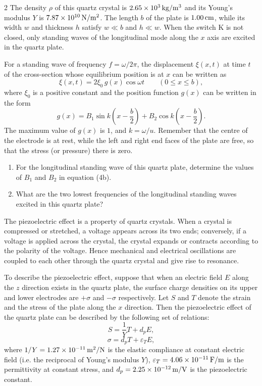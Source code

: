 \begin{problem}{2}
The density $\rho$ of this quartz crystal is $2.65\times10^{3}\,\mathrm{kg/m^3}$ and its Young's modulus $Y$ is $7.87\times10^{10}\,\mathrm{N/m^2}$. The length $b$ of the plate is $1.00\,\mathrm{cm}$, while its width $w$ and thickness $h$ satisfy $w\ll b$ and $h\ll w$. When the switch K is not closed, only standing waves of the longitudinal mode along the $x$ axis are excited in the quartz plate.

For a standing wave of frequency $f=\omega/2\pi$, the displacement $\xi(x,t)$ at time $t$ of the cross-section whose equilibrium position is at $x$ can be written as
\begin{equation}
\xi(x,t)=2\xi_0\,g(x)\cos\omega t\qquad (0\le x\le b), \tag{4a}
\end{equation}
where $\xi_0$ is a positive constant and the position function $g(x)$ can be written in the form
\begin{equation}
g(x)=B_1\sin k\left(x-\frac{b}{2}\right)+B_2\cos k\left(x-\frac{b}{2}\right). \tag{4b}
\end{equation}
The maximum value of $g(x)$ is $1$, and $k=\omega/u$. Remember that the centre of the electrode is at rest, while the left and right end faces of the plate are free, so that the stress (or pressure) there is zero.

\begin{enumerate}[label=(\alph*),leftmargin=2.2em,itemsep=1pt,start=3]
\item For the longitudinal standing wave of this quartz plate, determine the values of $B_1$ and $B_2$ in equation (4b).
\item What are the two lowest frequencies of the longitudinal standing waves excited in this quartz plate?
\end{enumerate}

The piezoelectric effect is a property of quartz crystals. When a crystal is compressed or stretched, a voltage appears across its two ends; conversely, if a voltage is applied across the crystal, the crystal expands or contracts according to the polarity of the voltage. Hence mechanical and electrical oscillations are coupled to each other through the quartz crystal and give rise to resonance.

To describe the piezoelectric effect, suppose that when an electric field $E$ along the $z$ direction exists in the quartz plate, the surface charge densities on its upper and lower electrodes are $+\sigma$ and $-\sigma$ respectively. Let $S$ and $T$ denote the strain and the stress of the plate along the $x$ direction. Then the piezoelectric effect of the quartz plate can be described by the following set of relations:
\begin{equation}
S=\frac{1}{Y}T+d_pE, \tag{5a}
\end{equation}
\begin{equation}
\sigma=d_pT+\varepsilon_TE, \tag{5b}
\end{equation}
where $1/Y=1.27\times10^{-11}\,\mathrm{m^2/N}$ is the elastic compliance at constant electric field (i.e. the reciprocal of Young's modulus $Y$), $\varepsilon_T=4.06\times10^{-11}\,\mathrm{F/m}$ is the permittivity at constant stress, and $d_p=2.25\times10^{-12}\,\mathrm{m/V}$ is the piezoelectric constant.


\end{problem}

